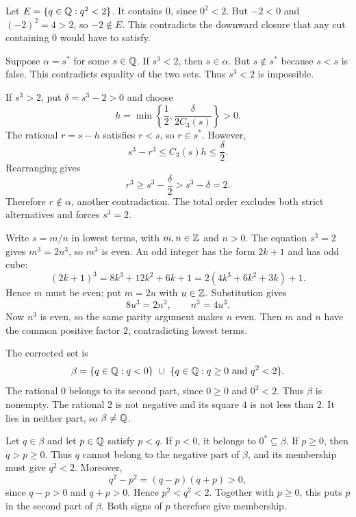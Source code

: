 Let $E=\{q\in\mathbb{Q}:q^2<2\}$. It contains $0$, since $0^2<2$.
But $-2<0$ and $(-2)^2=4>2$, so $-2\notin E$.
This contradicts the downward closure that any cut containing $0$
would have to satisfy.


Suppose $\alpha=s^*$ for some $s\in\mathbb{Q}$.
If $s^3<2$, then $s\in\alpha$. But $s\notin s^*$ because $s<s$
is false. This contradicts equality of the two sets.
Thus $s^3<2$ is impossible.

If $s^3>2$, put $\delta=s^3-2>0$ and choose
\[
 h=\min\left\{\frac12,\frac{\delta}{2C_3(s)}\right\}>0.
\]
The rational $r=s-h$ satisfies $r<s$, so $r\in s^*$.
However,
\[
 s^3-r^3\le C_3(s)h\le\frac\delta2.
\]
Rearranging gives
\[
 r^3\ge s^3-\frac\delta2>s^3-\delta=2.
\]
Therefore $r\notin\alpha$, another contradiction.
The total order excludes both strict alternatives and forces $s^3=2$.

Write $s=m/n$ in lowest terms, with $m,n\in\mathbb{Z}$ and $n>0$.
The equation $s^3=2$ gives $m^3=2n^3$, so $m^3$ is even.
An odd integer has the form $2k+1$ and has odd cube:
\[
 (2k+1)^3=8k^3+12k^2+6k+1
         =2(4k^3+6k^2+3k)+1.
\]
Hence $m$ must be even; put $m=2u$ with $u\in\mathbb{Z}$.
Substitution gives
\[
 8u^3=2n^3,\qquad n^3=4u^3.
\]
Now $n^3$ is even, so the same parity argument makes $n$ even.
Then $m$ and $n$ have the common positive factor $2$, contradicting
lowest terms.


The corrected set is
\[
 \beta=\{q\in\mathbb{Q}:q<0\}\ \cup\
       \{q\in\mathbb{Q}:q\ge0\text{ and }q^2<2\}.
\]
The rational $0$ belongs to its second part, since $0\ge0$ and $0^2<2$.
Thus $\beta$ is nonempty.
The rational $2$ is not negative and its square $4$ is not less than $2$.
It lies in neither part, so $\beta\ne\mathbb{Q}$.

Let $q\in\beta$ and let $p\in\mathbb{Q}$ satisfy $p<q$.
If $p<0$, it belongs to $0^*\subseteq\beta$.
If $p\ge0$, then $q>p\ge0$. Thus $q$ cannot belong to the negative
part of $\beta$, and its membership must give $q^2<2$.
Moreover,
\[
 q^2-p^2=(q-p)(q+p)>0,
\]
since $q-p>0$ and $q+p>0$. Hence $p^2<q^2<2$.
Together with $p\ge0$, this puts $p$ in the second part of $\beta$.
Both signs of $p$ therefore give membership.


